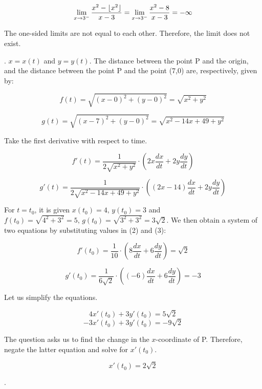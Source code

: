 \documentclass{article}
\DeclarePairedDelimiter\floor{\lfloor}{\rfloor}
\begin{document}
\[ \lim_{x\to 3^-} \frac{x^2-\floor{x^2}}{x-3} = \lim_{x\to 3^-}\frac{x^2-8}{x-3} = -\infty\]

\hfill

\noindent The one-sided limits are not equal to each other. Therefore, the limit does not exist.

\hfill

. $x=x(t)$ and $y=y(t)$. The distance between the point P and the origin, and the distance between the point P and the point (7,0) are, respectively, given by:

\[f(t) = \sqrt{(x-0)^2 + (y-0)^2} = \sqrt{x^2+y^2}\]

\[g(t) = \sqrt{(x-7)^2 + (y-0)^2} = \sqrt{x^2-14x +49+y^2}\]

\hfill

\noindent Take the first derivative with respect to time.

\begin{equation}f'(t)=\frac{1}{2\sqrt{x^2+y^2}}\cdot\left(2x\frac{dx}{dt}+2y\frac{dy}{dt}\right)\end{equation}

\begin{equation}g'(t)=\frac{1}{2\sqrt{x^2-14x +49+y^2}}\cdot\left((2x-14)\frac{dx}{dt}+2y\frac{dy}{dt}\right)\end{equation}

\hfill

\noindent For $t=t_0$, it is given $x(t_0) = 4,\,y(t_0) = 3$ and $f(t_0) = \sqrt{4^2 +3^2} = 5,\,g(t_0) = \sqrt{3^2 + 3^2} = 3\sqrt{2}$. We then obtain a system of two equations by substituting values in (2) and (3):

\[f'(t_0)=\frac{1}{10}\cdot\left(8\frac{dx}{dt}+6\frac{dy}{dt}\right)=\sqrt{2}\]

\[g'(t_0)=\frac{1}{6\sqrt{2}}\cdot\left((-6)\frac{dx}{dt}+6\frac{dy}{dt}\right)=-3\]

\hfill

\noindent Let us simplify the equations.

\[4x'(t_0)+3y'(t_0) = 5\sqrt{2} \]
\[-3x'(t_0)+3y'(t_0) = -9\sqrt{2} \]

\hfill

\noindent The question asks us to find the change in the $x$-coordinate of P. Therefore, negate the latter equation and solve for $x'(t_0)$.

\[ \boxed{x'(t_0) = 2\sqrt{2}} \]

\hfill

.
\end{document}
